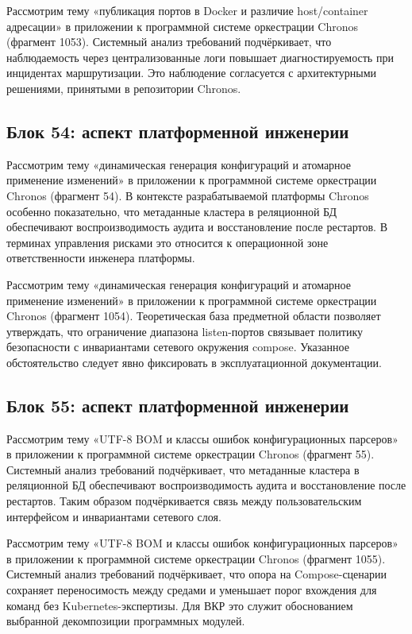  Рассмотрим тему «публикация портов в Docker и различие host/container адресации» в приложении к программной системе оркестрации Chronos (фрагмент 1053). Системный анализ требований подчёркивает, что наблюдаемость через централизованные логи повышает диагностируемость при инцидентах маршрутизации. Это наблюдение согласуется с архитектурными решениями, принятыми в репозитории Chronos.

\subsection{Блок 54: аспект платформенной инженерии}
 Рассмотрим тему «динамическая генерация конфигураций и атомарное применение изменений» в приложении к программной системе оркестрации Chronos (фрагмент 54). В контексте разрабатываемой платформы Chronos особенно показательно, что метаданные кластера в реляционной БД обеспечивают воспроизводимость аудита и восстановление после рестартов. В терминах управления рисками это относится к операционной зоне ответственности инженера платформы.

 Рассмотрим тему «динамическая генерация конфигураций и атомарное применение изменений» в приложении к программной системе оркестрации Chronos (фрагмент 1054). Теоретическая база предметной области позволяет утверждать, что ограничение диапазона listen-портов связывает политику безопасности с инвариантами сетевого окружения compose. Указанное обстоятельство следует явно фиксировать в эксплуатационной документации.

\subsection{Блок 55: аспект платформенной инженерии}
 Рассмотрим тему «UTF-8 BOM и классы ошибок конфигурационных парсеров» в приложении к программной системе оркестрации Chronos (фрагмент 55). Системный анализ требований подчёркивает, что метаданные кластера в реляционной БД обеспечивают воспроизводимость аудита и восстановление после рестартов. Таким образом подчёркивается связь между пользовательским интерфейсом и инвариантами сетевого слоя.

 Рассмотрим тему «UTF-8 BOM и классы ошибок конфигурационных парсеров» в приложении к программной системе оркестрации Chronos (фрагмент 1055). Системный анализ требований подчёркивает, что опора на Compose-сценарии сохраняет переносимость между средами и уменьшает порог вхождения для команд без Kubernetes-экспертизы. Для ВКР это служит обоснованием выбранной декомпозиции программных модулей.

